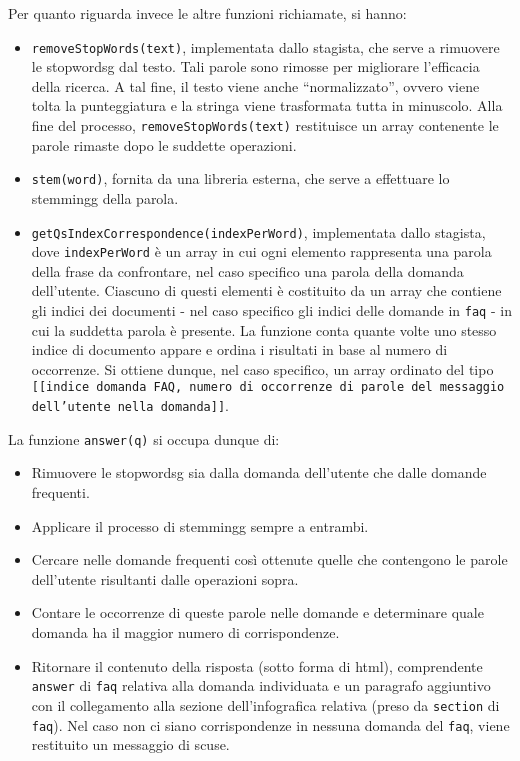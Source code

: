 \noindent Per quanto riguarda invece le altre funzioni richiamate, si hanno:
\begin{itemize}
    \item \texttt{removeStopWords(text)}, implementata dallo stagista, che serve a rimuovere le \gls{stopwordsg} dal testo. 
    Tali parole sono rimosse per migliorare l'efficacia della ricerca. A tal fine, il testo viene anche ``normalizzato'', ovvero viene
    tolta la punteggiatura e la stringa viene trasformata tutta in minuscolo.
    Alla fine del processo, \texttt{removeStopWords(text)} restituisce un array contenente le parole rimaste dopo le suddette operazioni.
    \item \texttt{stem(word)}, fornita da una libreria esterna, che serve a effettuare lo \gls{stemmingg} della parola.
    \item \texttt{getQsIndexCorrespondence(indexPerWord)}, implementata dallo stagista, dove \texttt{indexPerWord} è un array in cui ogni elemento rappresenta 
    una parola della frase da confrontare, nel caso specifico una parola della domanda dell'utente. Ciascuno di questi elementi è costituito da un array 
    che contiene gli indici dei documenti - nel caso specifico gli indici delle domande in \texttt{faq} - in cui la suddetta parola è presente.
    La funzione conta quante volte uno stesso indice di documento appare e ordina i risultati in base al numero di occorrenze. Si ottiene dunque, nel caso specifico, 
    un array ordinato del tipo \texttt{[[indice domanda FAQ, numero di occorrenze di parole del messaggio dell'utente nella domanda]]}. 
\end{itemize}
La funzione \texttt{answer(q)} si occupa dunque di:
\begin{itemize}
    \item Rimuovere le \gls{stopwordsg} sia dalla domanda dell'utente che dalle domande frequenti.
    \item Applicare il processo di \gls{stemmingg} sempre a entrambi.
    \item Cercare nelle domande frequenti così ottenute quelle che contengono le parole dell'utente risultanti dalle operazioni sopra.
    \item Contare le occorrenze di queste parole nelle domande e determinare quale domanda ha il maggior numero di corrispondenze.
    \item Ritornare il contenuto della risposta (sotto forma di \gls{html}), comprendente \texttt{answer} di \texttt{faq} relativa 
    alla domanda individuata e un paragrafo aggiuntivo con il collegamento alla sezione dell'infografica relativa (preso da \texttt{section} di \texttt{faq}).
    Nel caso non ci siano corrispondenze in nessuna domanda del \texttt{faq}, viene restituito un messaggio di scuse.
\end{itemize}

